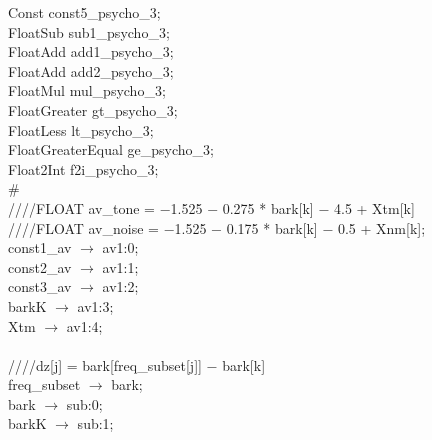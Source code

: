 {\hspace*{2em}Const const5\_psycho\_3; \\
\hspace*{2em}FloatSub sub1\_psycho\_3; \\
\hspace*{2em}FloatAdd add1\_psycho\_3; \\
\hspace*{2em}FloatAdd add2\_psycho\_3; \\
\hspace*{2em}FloatMul mul\_psycho\_3; \\
\hspace*{2em}FloatGreater gt\_psycho\_3; \\
\hspace*{2em}FloatLess lt\_psycho\_3; \\
\hspace*{2em}FloatGreaterEqual ge\_psycho\_3; \\
\hspace*{2em}Float2Int f2i\_psycho\_3; \\
\# \\
\hspace*{2em}////FLOAT av\_tone = $-$1.525 $-$ 0.275 * bark[k] $-$ 4.5 + Xtm[k] \\
\hspace*{2em}////FLOAT av\_noise = $-$1.525 $-$ 0.175 * bark[k] $-$ 0.5 + Xnm[k]; \\
\hspace*{2em}const1\_av $\rightarrow$ av1:0; \\
\hspace*{2em}const2\_av $\rightarrow$ av1:1; \\
\hspace*{2em}const3\_av $\rightarrow$ av1:2; \\
\hspace*{2em}barkK $\rightarrow$ av1:3; \\
\hspace*{2em}Xtm $\rightarrow$ av1:4; \\
   \\
   \hspace*{2em}////dz[j] = bark[freq\_subset[j]] $-$ bark[k] \\
   \hspace*{2em}freq\_subset $\rightarrow$ bark; \\
   \hspace*{2em}bark $\rightarrow$ sub:0; \\
   \hspace*{2em}barkK $\rightarrow$ sub:1; \\
}
